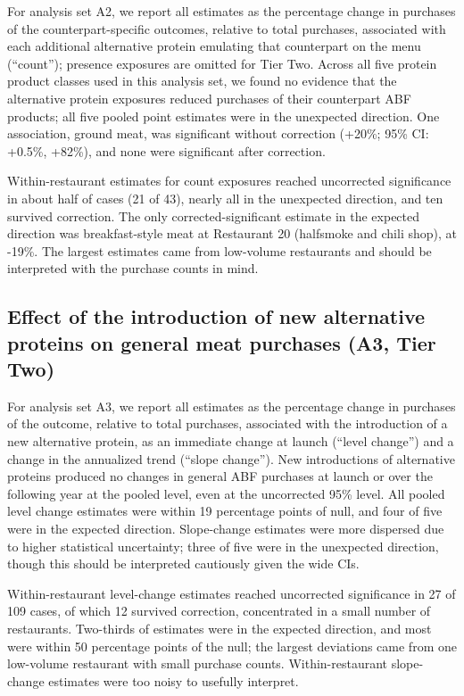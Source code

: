 For analysis set A2, we report all estimates as the percentage change in purchases of the counterpart-specific outcomes, relative to total purchases, associated with each additional alternative protein emulating that counterpart on the menu (``count''); presence exposures are omitted for Tier Two. Across all five protein product classes used in this analysis set, we found no evidence that the alternative protein exposures reduced purchases of their counterpart ABF products; all five pooled point estimates were in the unexpected direction. One association, ground meat, was significant without correction (+20\%; 95\% CI: +0.5\%, +82\%), and none were significant after correction.

Within-restaurant estimates for count exposures reached uncorrected significance in about half of cases (21 of 43), nearly all in the unexpected direction, and ten survived correction. The only corrected-significant estimate in the expected direction was breakfast-style meat at Restaurant 20 (halfsmoke and chili shop), at -19\%. The largest estimates came from low-volume restaurants and should be interpreted with the purchase counts in mind.

\subsection{Effect of the introduction of new alternative proteins on general meat purchases (A3, Tier Two)}

For analysis set A3, we report all estimates as the percentage change in purchases of the outcome, relative to total purchases, associated with the introduction of a new alternative protein, as an immediate change at launch (``level change'') and a change in the annualized trend (``slope change''). New introductions of alternative proteins produced no changes in general ABF purchases at launch or over the following year at the pooled level, even at the uncorrected 95\% level. All pooled level change estimates were within 19 percentage points of null, and four of five were in the expected direction. Slope-change estimates were more dispersed due to higher statistical uncertainty; three of five were in the unexpected direction, though this should be interpreted cautiously given the wide CIs.

Within-restaurant level-change estimates reached uncorrected significance in 27 of 109 cases, of which 12 survived correction, concentrated in a small number of restaurants. Two-thirds of estimates were in the expected direction, and most were within 50 percentage points of the null; the largest deviations came from one low-volume restaurant with small purchase counts. Within-restaurant slope-change estimates were too noisy to usefully interpret.

